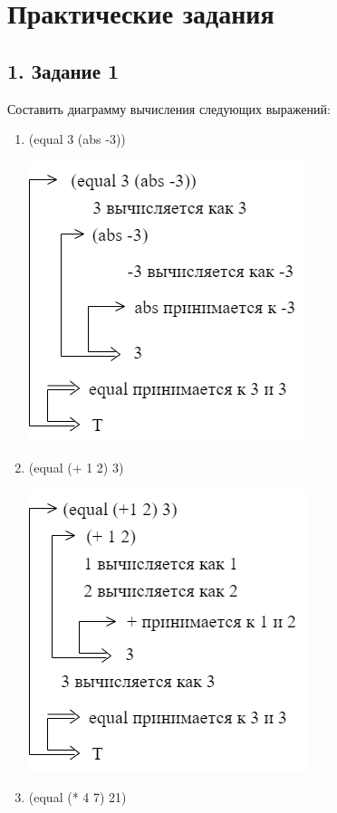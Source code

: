 \newpage
\section*{Практические задания}
\subsection*{1. Задание 1}
Составить диаграмму вычисления следующих выражений:

\begin{enumerate}
	\item (equal 3 (abs -3))

	\includegraphics[scale=1.0]{img/1.1}	

	\item (equal (+ 1 2) 3)	

	\includegraphics[scale=1.0]{img/1.2}	
\newpage
	\item (equal (* 4 7) 21)


\end{enumerate}
